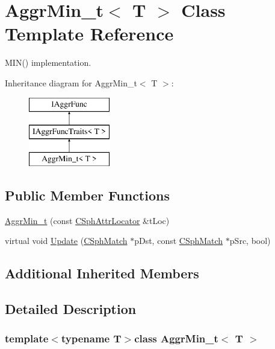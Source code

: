\hypertarget{classAggrMin__t}{\section{Aggr\-Min\-\_\-t$<$ T $>$ Class Template Reference}
\label{classAggrMin__t}
}


M\-I\-N() implementation.  


Inheritance diagram for Aggr\-Min\-\_\-t$<$ T $>$\-:\begin{figure}[H]
\begin{center}
\leavevmode
\includegraphics[height=3.000000cm]{classAggrMin__t}
\end{center}
\end{figure}
\subsection*{Public Member Functions}
\begin{DoxyCompactItemize}
\item 
\hyperlink{classAggrMin__t_a694f45be8aa64e09b51b2fe4ec91489f}{Aggr\-Min\-\_\-t} (const \hyperlink{structCSphAttrLocator}{C\-Sph\-Attr\-Locator} \&t\-Loc)
\item 
virtual void \hyperlink{classAggrMin__t_a7edf4fd46be0f241492fc155b7cc9f03}{Update} (\hyperlink{classCSphMatch}{C\-Sph\-Match} $\ast$p\-Dst, const \hyperlink{classCSphMatch}{C\-Sph\-Match} $\ast$p\-Src, bool)
\end{DoxyCompactItemize}
\subsection*{Additional Inherited Members}


\subsection{Detailed Description}
\subsubsection*{template$<$typename T$>$class Aggr\-Min\-\_\-t$<$ T $>$}


